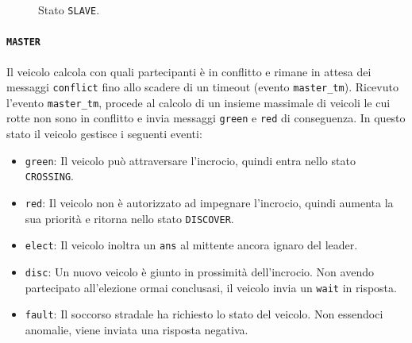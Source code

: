 \documentclass{memoir}
\begin{document}
\begin{figure}[h]
  \centering
  \caption{Stato \texttt{SLAVE}.}                  
\end{figure}

\paragraph{\texttt{MASTER}}
Il veicolo calcola con quali partecipanti è in conflitto e rimane in attesa dei
messaggi \texttt{conflict} fino allo scadere di un timeout (evento
\texttt{master\_tm}). Ricevuto l'evento \texttt{master\_tm}, procede al calcolo
di un insieme massimale di veicoli le cui rotte non sono in conflitto e invia
messaggi \texttt{green} e \texttt{red} di conseguenza. In questo stato il
veicolo gestisce i seguenti eventi:
\begin{itemize}
\item \texttt{green}: Il veicolo può attraversare l'incrocio, quindi entra nello
  stato \texttt{CROSSING}.
\item \texttt{red}: Il veicolo non è autorizzato ad impegnare l'incrocio, quindi
  aumenta la sua priorità e ritorna nello stato \texttt{DISCOVER}.
\item \texttt{elect}: Il veicolo inoltra un \texttt{ans} al mittente ancora
  ignaro del leader.
\item \texttt{disc}: Un nuovo veicolo è giunto in prossimità dell'incrocio. Non
  avendo partecipato all'elezione ormai conclusasi, il veicolo invia un
  \texttt{wait} in risposta.
\item \texttt{fault}: Il soccorso stradale ha richiesto lo stato del veicolo.
  Non essendoci anomalie, viene inviata una risposta negativa.
\end{itemize}
\end{document}
